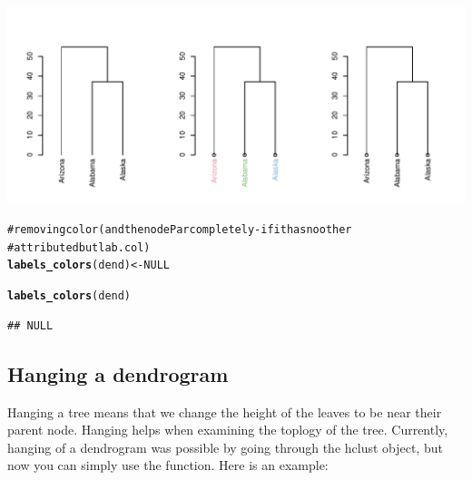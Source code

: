 \documentclass[shortnames,nojss,article]{jss}\usepackage{graphicx, color}
\makeatletter
\def\maxwidth{ %
  \ifdim\Gin@nat@width>\linewidth
    \linewidth
  \else
    \Gin@nat@width
  \fi
}
\newcommand{\hlfunctioncall}[1]{\textcolor[rgb]{0.501960784313725,0,0.329411764705882}{\textbf{#1}}}%
\newcommand{\hlcomment}[1]{\textcolor[rgb]{0.180392156862745,0.6,0.341176470588235}{#1}}%
\newenvironment{kframe}{%
 \def\at@end@of@kframe{}%
 \ifinner\ifhmode%
  \def\at@end@of@kframe{\end{minipage}}%
  \begin{minipage}{\columnwidth}%
 \fi\fi%
 \def\FrameCommand##1{\hskip\@totalleftmargin \hskip-\fboxsep
 \colorbox{shadecolor}{##1}\hskip-\fboxsep
     \hskip-\linewidth \hskip-\@totalleftmargin \hskip\columnwidth}%
 \MakeFramed {\advance\hsize-\width
   \@totalleftmargin\z@ \linewidth\hsize
   \@setminipage}}%
 {\par\unskip\endMakeFramed%
 \at@end@of@kframe}
\newenvironment{knitrout}{}{} %
\makeatother
\begin{document}
\begin{knitrout}
{\centering \includegraphics[width=\maxwidth]{figure/unnamed-chunk-26} 

}


\begin{kframe}\begin{alltt}

\hlcomment{# removing color (and the nodePar completely - if it has no other}
\hlcomment{# attributed but lab.col)}
\hlfunctioncall{labels_colors}(dend) <- NULL
\end{alltt}


{\ttfamily\noindent\color{warningcolor}{\#\# Warning: Length of color vector was shorter then the number of leaves - vector color recycled}}

{\ttfamily\noindent\color{warningcolor}{\#\# Warning: 'x' is NULL so the result will be NULL}}\begin{alltt}
\hlfunctioncall{labels_colors}(dend)
\end{alltt}
\begin{verbatim}
## NULL
\end{verbatim}
\end{kframe}
\end{knitrout}





\subsection{Hanging a dendrogram}

Hanging a tree means that we change the height of the leaves to be near their parent node. Hanging helps when examining the toplogy of the tree. Currently, hanging of a dendrogram was possible by going through the hclust object, but now you can simply use the  function. Here is an example:
\end{document}
